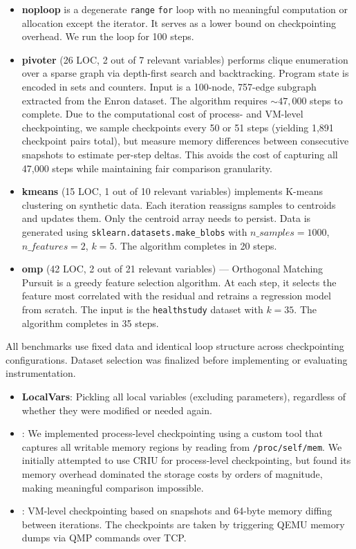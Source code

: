 \begin{itemize}
    \item \textbf{noploop} is a degenerate \texttt{range} \texttt{for} loop with no meaningful computation or allocation except the iterator. It serves as a lower bound on checkpointing overhead. We run the loop for 100 steps.

    \item \textbf{pivoter} (26 LOC, 2 out of 7 relevant variables) performs clique enumeration over a sparse graph via depth-first search and backtracking. Program state is encoded in sets and counters. Input is a 100-node, 757-edge subgraph extracted from the Enron dataset. The algorithm requires $\sim 47,000$ steps to complete. Due to the computational cost of process- and VM-level checkpointing, we sample checkpoints every 50 or 51 steps (yielding 1,891 checkpoint pairs total), but measure memory differences between consecutive snapshots to estimate per-step deltas. This avoids the cost of capturing all 47,000 steps while maintaining fair comparison granularity.

    \item \textbf{kmeans} (15 LOC, 1 out of 10 relevant variables) implements K-means clustering on synthetic data. Each iteration reassigns samples to centroids and updates them. Only the centroid array needs to persist. Data is generated using \texttt{sklearn.datasets.make\_blobs} with $n\_samples=1000$, $n\_features=2$, $k=5$. The algorithm completes in 20 steps.

    \item \textbf{omp} (42 LOC, 2 out of 21 relevant variables) --- Orthogonal Matching Pursuit is a greedy feature selection algorithm. At each step, it selects the feature most correlated with the residual and retrains a regression model from scratch. The input is the \texttt{healthstudy} dataset with $k = 35$. The algorithm completes in 35 steps.
\end{itemize}

All benchmarks use fixed data and identical loop structure across checkpointing configurations. Dataset selection was finalized before implementing or evaluating instrumentation.

\begin{itemize}
  \item \textbf{LocalVars}: Pickling all local variables (excluding parameters), regardless of whether they were modified or needed again.
  \item \textbf{\PROCDIFF}: We implemented process-level checkpointing using a custom tool that captures all writable memory regions by reading from \texttt{/proc/self/mem}. We initially attempted to use CRIU for process-level checkpointing, but found its memory overhead dominated the storage costs by orders of magnitude, making meaningful comparison impossible. 
  \item \textbf{\VMDIFF}: VM-level checkpointing based on snapshots and 64-byte memory diffing between iterations. The checkpoints are taken by triggering QEMU memory dumps via QMP commands over TCP.
\end{itemize}

